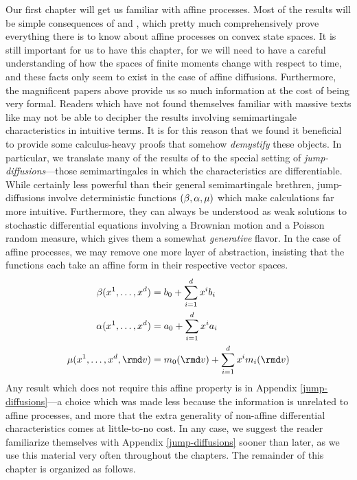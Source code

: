 Our first chapter will get us familiar with affine processes.
Most of the results will be simple consequences of \cite{cuchiero2011} and \cite{keller2015}, which pretty much comprehensively prove everything there is to know about affine processes on convex state spaces.
It is still important for us to have this chapter, for we will need to have a careful understanding of how the spaces of finite moments change with respect to time, and these facts only seem to exist in the case of affine diffusions.
Furthermore, the magnificent papers above provide us so much information at the cost of being very formal.
Readers which have not found themselves familiar with massive texts like \cite{jacod2003} may not be able to decipher the results involving semimartingale characteristics in intuitive terms.
It is for this reason that we found it beneficial to provide some calculus-heavy proofs that somehow \emph{demystify} these objects.
In particular, we translate many of the results of \cite{jacod2003} to the special setting of \emph{jump-diffusions}---those semimartingales in which the characteristics are differentiable.
While certainly less powerful than their general semimartingale brethren, jump-diffusions involve deterministic functions $(\beta, \alpha, \mu)$ which make calculations far more intuitive.
Furthermore, they can always be understood as weak solutions to stochastic differential equations involving a Brownian motion and a Poisson random measure, which gives them a somewhat \emph{generative} flavor.
In the case of affine processes, we may remove one more layer of abstraction, insisting that the functions each take an affine form in their respective vector spaces.
\begin{align*}
  \affDrift(\stateVar^1, \ldots, \stateVar^d) &= \affDriftPart_0 + \sum_{i=1}^d \stateVar^i \affDriftPart_i \\
  \affDiff(\stateVar^1, \ldots, \stateVar^d) &= \affDiffPart_0 + \sum_{i=1}^d \stateVar^i \affDiffPart_i \\
  \affJump(\stateVar^1, \ldots, \stateVar^d, \rmd\markVar) &= \affJumpPart_0(\rmd\markVar) + \sum_{i=1}^d \stateVar^i \affJumpPart_i(\rmd\markVar) 
\end{align*}
Any result which does not require this affine property is in Appendix \ref{jump-diffusions}---a choice which was made less because the information is unrelated to affine processes, and more that the extra generality of non-affine differential characteristics comes at little-to-no cost.
In any case, we suggest the reader familiarize themselves with Appendix \ref{jump-diffusions} sooner than later, as we use this material very often throughout the chapters.
The remainder of this chapter is organized as follows.

